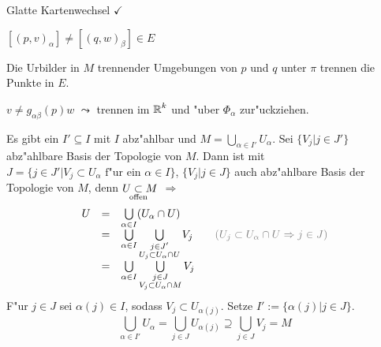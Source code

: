 \begin{Loes}
\begin{description}[leftmargin=*]
	Glatte Kartenwechsel $\checkmark$
\item[$\bm{E}$ Hausdorffsch:]
	$[(p,v)_\alpha] \ne [(q,w)_\beta] \in E$
	\begin{description}[font=\normalfont,leftmargin=*]
	\item[$p\ne q$:]
		Die Urbilder in $M$ trennender Umgebungen von $p$ und $q$ unter $\pi$ trennen die Punkte in $E$.
	\item[$p=q$:]
		$v \ne g_{\alpha\beta}(p) w$ $\leadsto$ trennen im $\operatorname{\mathbb{R}}^k$ und "uber $\Phi_\alpha$ zur"uckziehen.
	\end{description}
\item[abz"ahlbare basis der Topologie (f"ur $\bm{U_{\alpha}} \bm{\X} \R^{\bm{k}} \bm{\checkmark}$):]
	Es gibt ein $I ' \subseteq I$ mit $I$ abz"ahlbar und $M = \bigcup_{\alpha \in I'} U_\alpha$. Sei $\{V_j | j \in J'\}$ abz"ahlbare Basis der Topologie von $M$. Dann ist mit $J = \{j \in J' | V_j \subset U_\alpha \text{ f"ur ein } \alpha \in I\}$, $\{V_j | j \in J\}$ auch abz"ahlbare Basis der Topologie von $M$, denn $U \underset{\mathclap{\text{offen}}}{\subset} M$ $\Rightarrow$
		\[\begin{array}{rcl} U &=& \bigcup\limits_{\alpha \in I} (U_\alpha \cap U)\\
			&=& \bigcup\limits_{\alpha \in I} \bigcup\limits_{\substack{j \in J' \\ U_j \subset U_\alpha \cap U}} V_j \qquad \textcolor{gray}{(U_j \subset U_\alpha \cap U \Rightarrow j \in J)}\\
			&=& \bigcup\limits_{\alpha \in I} \bigcup\limits_{\substack{j \in J \\ V_j \subset U_\alpha \cap M}} V_j \end{array}\]
	F"ur $j \in J$ sei $\alpha(j) \in I$, sodass $V_j \subset U_{\alpha(j)}$. Setze $I' := \{ \alpha(j) | j \in J\}$.
		\[ \bigcup_{\alpha \in I'} U_\alpha = \bigcup_{j \in J} U_{\alpha(j)} \supseteq \bigcup_{j \in J} V_j = M \]
\end{description}\end{Loes}

